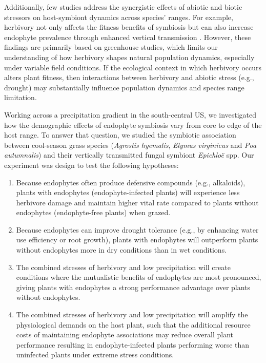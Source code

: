 \documentclass[12pt]{article}\usepackage[]{graphicx}\usepackage[dvipsnames]{xcolor}
\begin{document}
Additionally, few studies address the synergistic effects of abiotic and biotic stressors on host-symbiont dynamics across species’ ranges.
For example, herbivory not only affects the fitness benefits of symbiosis but can also increase endophyte prevalence through enhanced vertical transmission \citep{gundel2020simulated, agrawal1999transgenerational}.
However, these findings are primarily based on greenhouse studies, which limits our understanding of how herbivory shapes natural population dynamics, especially under variable field conditions.
If the ecological context in which herbivory occurs alters plant fitness, then interactions between herbivory and abiotic stress (e.g., drought) may substantially influence population dynamics and species range  limitation.

Working across a precipitation gradient in the south-central US, we investigated  how the demographic effects of endophyte symbiosis vary from core to edge of the host range.
To answer that question, we studied the symbiotic association between cool-season grass species (\emph{Agrostis hyemalis}, \emph{Elymus virginicus} and \emph{Poa autumnalis}) and their  vertically transmitted fungal symbiont \emph{Epichloë} spp. 
Our experiment was design to test the following hypotheses:
\begin{enumerate}
    \item Because endophytes often produce defensive compounds (e.g., alkaloids), plants with endophytes (endophyte-infected plants) will experience less herbivore damage and maintain higher vital rate compared to plants without endophytes (endophyte-free plants) when grazed.
    \item Because endophytes can improve drought tolerance (e.g., by enhancing water use efficiency or root growth), plants with endophytes will outperform plants without endophytes more in dry conditions than in wet conditions.
     \item The combined stresses of herbivory and low precipitation will create conditions where the mutualistic benefits of endophytes are most pronounced, giving plants with endophytes a strong performance advantage over plants without endophytes.
     \item The combined stresses of herbivory and low precipitation will amplify the physiological demands on the host plant, such that the additional resource costs of maintaining endophyte associations may reduce overall plant performance resulting in endophyte-infected plants performing worse than uninfected plants under extreme stress conditions.
\end{enumerate}
\end{document}
